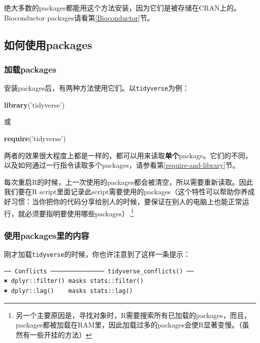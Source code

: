 \documentclass[]{book}
\newenvironment{Shaded}{\begin{snugshade}}{\end{snugshade}}
\newcommand{\KeywordTok}[1]{\textcolor[rgb]{0.13,0.29,0.53}{\textbf{#1}}}
\newcommand{\NormalTok}[1]{#1}
\newcommand{\StringTok}[1]{\textcolor[rgb]{0.31,0.60,0.02}{#1}}
\let\rmarkdownfootnote\footnote%
\def\footnote{\protect\rmarkdownfootnote}
\begin{document}
绝大多数的packages都能用这个方法安装，因为它们是被存储在CRAN上的。Bioconductor packages请看第\ref{Bioconductor}节。

\hypertarget{package-use}{%
\subsection{如何使用packages}\label{package-use}}

\hypertarget{pkg-load}{%
\subsubsection{加载packages}\label{pkg-load}}

安装packages后，有两种方法使用它们。以\texttt{tidyverse}为例：

\begin{Shaded}
\begin{Highlighting}[]
\KeywordTok{library}\NormalTok{(}\StringTok{'tidyverse'}\NormalTok{)}
\end{Highlighting}
\end{Shaded}

或

\begin{Shaded}
\begin{Highlighting}[]
\KeywordTok{require}\NormalTok{(}\StringTok{'tidyverse'}\NormalTok{)}
\end{Highlighting}
\end{Shaded}

两者的效果很大程度上都是一样的，都可以用来读取\textbf{单个}package。它们的不同，以及如何通过一行指令读取多个packages，请参看第\ref{require-and-library}节。

每次重启R的时候，上一次使用的packages都会被清空，所以需要重新读取。因此我们要在R script里面记录此script需要使用的packages（这个特性可以帮助你养成好习惯：当你把你的代码分享给别人的时候，要保证在别人的电脑上也能正常运行，就必须要指明要使用哪些packages）.\footnote{另一个主要原因是，寻找对象时，R需要搜索所有已加载的packages，而且，packages都被加载在RAM里，因此加载过多的packages会使R显著变慢。（虽然有一些开挂的方法）}

\hypertarget{pkg-colon}{%
\subsubsection{使用packages里的内容}\label{pkg-colon}}

刚才加载\texttt{tidyverse}的时候，你也许注意到了这样一条提示：

\begin{verbatim}
── Conflicts ─────────────── tidyverse_conflicts() ──
✖ dplyr::filter() masks stats::filter()
✖ dplyr::lag()    masks stats::lag()
\end{verbatim}
\end{document}
